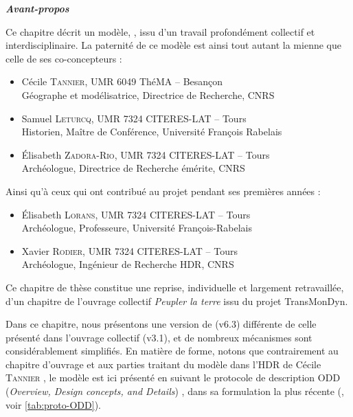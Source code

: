 \begin{mdframed}[backgroundcolor=black!5,footnoteinside=false]
\textbf{\hypertarget{avant-propos}{\textit{Avant-propos}}}

Ce chapitre décrit un modèle, \simfeodal{}, issu d'un travail profondément collectif et interdisciplinaire.
La paternité de ce modèle est ainsi tout autant la mienne que celle de ses co-concepteurs :
\begin{itemize}
	\item Cécile \textsc{Tannier}, UMR 6049 ThéMA -- Besançon\\
	Géographe et modélisatrice, Directrice de Recherche, CNRS
	\item Samuel \textsc{Leturcq}, UMR 7324 CITERES-LAT -- Tours\\
	Historien, Maître de Conférence, Université François Rabelais
	\item Élisabeth \textsc{Zadora-Rio}, UMR 7324 CITERES-LAT -- Tours\\
	Archéologue, Directrice de Recherche émérite, CNRS
\end{itemize}
Ainsi qu'à ceux qui ont contribué au projet pendant ses premières années :
\begin{itemize}
	\item Élisabeth \textsc{Lorans}, UMR 7324 CITERES-LAT -- Tours\\
	Archéologue, Professeure, Université François-Rabelais
	\item Xavier \textsc{Rodier}, UMR 7324 CITERES-LAT -- Tours\\
	Archéologue, Ingénieur de Recherche HDR, CNRS
\end{itemize}
Ce chapitre de thèse constitue une reprise, individuelle et largement retravaillée, d'un chapitre \autocite{cura_transition_2017} de l'ouvrage collectif \textit{Peupler la terre} \autocite{sanders2018peupler} issu du projet TransMonDyn\footnotemark.

Dans ce chapitre, nous présentons une version de \simfeodal{} (v6.3) différente de celle présenté dans l'ouvrage collectif (v3.1), et de nombreux mécanismes sont considérablement simplifiés.
En matière de forme, notons que contrairement au chapitre d'ouvrage et aux parties traitant du modèle dans l'HDR de Cécile \textsc{Tannier} \autocite{tannier_analyse_2017}, le modèle \simfeodal{}{} est ici présenté en suivant le protocole de description \og ODD\fg{} (\textit{Overview, Design concepts, and Details}) \autocite{grimm_odd_2010}, dans sa formulation la plus récente (\cite{grimm_documenting_2017}, voir \cref{tab:proto-ODD}).


\end{mdframed}
